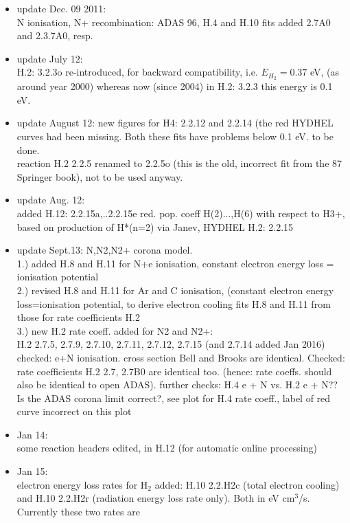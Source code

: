 \documentclass[12pt,dvipdfmx]{article}
\begin{document}
\begin{itemize}
  \item update Dec. 09 2011: \\
   N ionisation, N+ recombination: ADAS 96, H.4 and H.10 fits added 2.7A0 and 2.3.7A0, resp.
  \item update July 12:  \\
  H.2: 3.2.3o re-introduced, for backward compatibility, i.e. $E_{H_2}=0.37$ eV, (as around year 2000)
  whereas now (since 2004) in  H.2: 3.2.3 this energy is 0.1 eV.
  \item update August 12: new figures for H4: 2.2.12 and 2.2.14 (the red
  HYDHEL curves had been missing. Both these fits have problems below 0.1 eV. to be done.\\
  reaction H.2 2.2.5 renamed to 2.2.5o (this is the old, incorrect fit from the 87 Springer book),
  not to be used anyway.
  \item update Aug. 12: \\
  added H.12: 2.2.15a,..2.2.15e red. pop. coeff H(2)...,H(6) with respect to H3+,
  based on production of H*(n=2) via Janev, HYDHEL H.2: 2.2.15
  \item update Sept.13: N,N2,N2+ corona model. \\
  1.) added H.8 and H.11 for N+e ionisation, constant electron energy loss = ionisation potential\\
  2.) revised H.8 and H.11 for Ar and C ionisation, (constant electron energy loss=ionisation potential,
  to derive electron cooling fits H.8 and H.11 from those for rate coefficients H.2\\
  3.) new H.2 rate coeff. added for N2 and N2+:        \\
  H.2 2.7.5, 2.7.9, 2.7.10, 2.7.11, 2.7.12, 2.7.15  (and 2.7.14 added Jan 2016)
  \\
  checked: e+N ionisation. cross section Bell and Brooks are identical.
  Checked: rate coefficients H.2  2.7, 2.7B0 are identical too.
  (hence: rate coeffs. should also be identical to open ADAS).
  further checks:
  H.4 e + N vs. H.2 e + N?? Is the ADAS corona limit correct?, see plot for H.4 rate coeff.,
  label of red curve incorrect on this plot
  \item Jan 14:\\
  some reaction headers  edited, in H.12 (for automatic online processing)
  \item Jan 15:\\
  electron energy loss rates for H$_2$ added: H.10  2.2.H2c (total electron cooling)
  and H.10 2.2.H2r  (radiation energy loss rate only). Both in eV cm$^3$/s. Currently these two rates are

\end{itemize}
\end{document}
